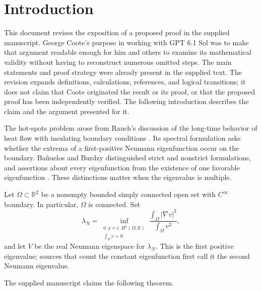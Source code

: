 \section{Introduction}\label{sec:introduction}

This document revises the exposition of a proposed proof in the supplied
manuscript. George Coote's purpose in working with GPT 6.1 Sol was to make
that argument readable enough for him and others to examine its
mathematical validity without having to reconstruct numerous omitted
steps. The main statements and proof strategy were already present in
the supplied text. The revision expands definitions, calculations,
references, and logical transitions; it does not claim that Coote
originated the result or its proof, or that the proposed proof has been
independently verified. The following introduction describes the claim
and the argument presented for it.

The hot-spots problem arose from Rauch's discussion of the long-time
behavior of heat flow with insulating boundary conditions \cite{Rau75}.
Its spectral formulation asks whether the extrema of a first-positive
Neumann eigenfunction occur on the boundary. Ba\~nuelos and Burdzy
distinguished strict and nonstrict formulations, and assertions about
every eigenfunction from the existence of one favorable eigenfunction
\cite{BanuelosBurdzy}. These distinctions matter when the eigenvalue is multiple.

Let $\Omega\subset\mathbb R^2$ be a nonempty bounded simply connected open
set with $C^\infty$ boundary. In particular, $\Omega$ is connected. Set
\begin{equation}\label{eq:first-neumann-eigenvalue}
 \lambda_N=\inf_{\substack{0\ne v\in H^1(\Omega;\mathbb R)\\
                            \int_\Omega v=0}}
 \frac{\int_\Omega|\nabla v|^2}{\int_\Omega v^2},
\end{equation}
and let $V$ be the real Neumann eigenspace for $\lambda_N$.
This is the first positive eigenvalue; sources that count the constant
eigenfunction first call it the second Neumann eigenvalue.

The supplied manuscript claims the following theorem.
\begin{samepage}
\end{samepage}

